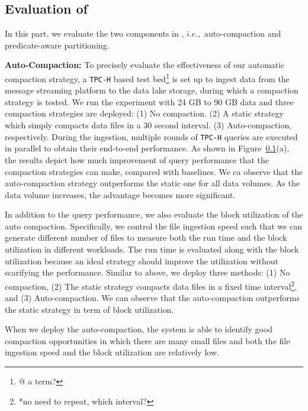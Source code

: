 \subsection{Evaluation of \brain}

In this part, we evaluate the two components in \brain, $i.e.,$ auto-compaction and predicate-aware partitioning.

 
\noindent \textbf{Auto-Compaction:} To precisely evaluate the effectiveness of our automatic compaction strategy, a \texttt{TPC-H} based test bed\footnote{@ a term?} is set up to ingest data from the message streaming platform to the data lake storage, during which a compaction strategy is tested. We run the experiment with 24 GB to 90 GB data and three compaction strategies are deployed: (1) No compaction. (2) A static strategy which simply compacts data files in a 30 second interval. (3) Auto-compaction, respectively. 
During the ingestion, multiple rounds of \texttt{TPC-H} queries are executed in parallel  to obtain their end-to-end performance. As shown in Figure~\ref{}(a), the results depict how much improvement of  query performance that the compaction strategies can make, compared with baselines.
 We ca observe that the auto-compaction strategy outperforms the static one for all data volumes. As the data volume increases, the advantage becomes more significant. 


In addition to the query performance, we also evaluate the block utilization of the auto compaction. Specifically, we control the file ingestion speed such that we can generate different number of files to measure both the run time and the block utilization in different workloads. The run time is evaluated along with the block utilization because an ideal strategy should improve the utilization without scarifying the performance. Similar to above, we deploy three methods: (1) No compaction, (2) The static strategy compacts data files in a fixed time interval\footnote{*no need to repeat, which interval?}, and (3) Auto-compaction. We can observe that the auto-compaction outperforms the static strategy in term of block utilization. 




When we deploy the auto-compaction, the system is able to identify good compaction opportunities in which there are many small files and both the file ingestion speed and the block utilization are relatively low. 

